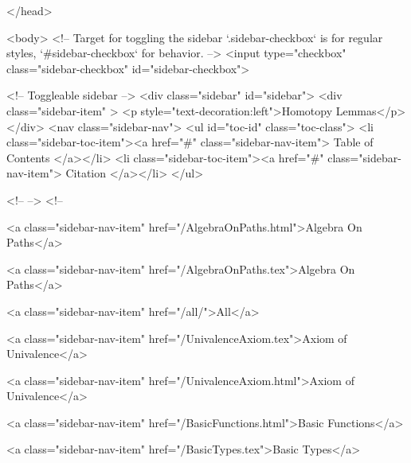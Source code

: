   
</head>




  <body>
    <!-- Target for toggling the sidebar `.sidebar-checkbox` is for regular
     styles, `#sidebar-checkbox` for behavior. -->
<input type="checkbox" class="sidebar-checkbox" id="sidebar-checkbox">

<!-- Toggleable sidebar -->
<div class="sidebar" id="sidebar">
  <div class="sidebar-item" >
    <p style="text-decoration:left">Homotopy Lemmas</p>
  </div>
  <nav class="sidebar-nav">
    <ul id="toc-id" class="toc-class">
  <li class="sidebar-toc-item"><a href="#" class="sidebar-nav-item"> Table of Contents </a></li>
  <li class="sidebar-toc-item"><a href="#" class="sidebar-nav-item"> Citation </a></li>
</ul>


    <!--  -->
    <!-- 
      
    
      
    
      
    
      
        
      
    
      
        
          <a class="sidebar-nav-item" href="/AlgebraOnPaths.html">Algebra On Paths</a>
        
      
    
      
        
          <a class="sidebar-nav-item" href="/AlgebraOnPaths.tex">Algebra On Paths</a>
        
      
    
      
        
          <a class="sidebar-nav-item" href="/all/">All</a>
        
      
    
      
        
          <a class="sidebar-nav-item" href="/UnivalenceAxiom.tex">Axiom of Univalence</a>
        
      
    
      
        
          <a class="sidebar-nav-item" href="/UnivalenceAxiom.html">Axiom of Univalence</a>
        
      
    
      
        
          <a class="sidebar-nav-item" href="/BasicFunctions.html">Basic Functions</a>
        
      
    
      
        
          <a class="sidebar-nav-item" href="/BasicTypes.tex">Basic Types</a>
        

